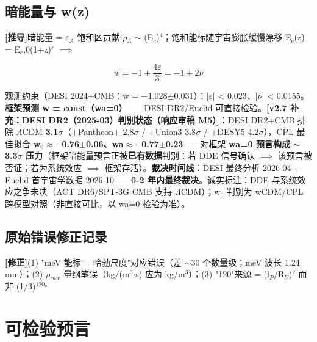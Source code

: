 \documentclass[UTF8,fontset=windows]{csoarticle}
\newcommand{\mtag}[1]{\textbf{[#1]}}
\newcommand{\up}[1]{\ensuremath{^{#1}}}
\newcommand{\down}[1]{\ensuremath{_{#1}}}
\begin{document}
\subsection{暗能量与 w(z)}

\mtag{推导}暗能量 = \ensuremath{\varepsilon}\down{A} 饱和区贡献 \ensuremath{\rho}\down{\Lambda{}} \ensuremath{\sim} (E\down{c})\up{4}；饱和能标随宇宙膨胀缓慢漂移 E\down{c}(z) = E\down{c},0(1+z)\up{\varepsilon{}} \ensuremath{\implies}

\[w = -1 + \frac{4\varepsilon}{3} = -1 + 2\nu\]

观测约束（DESI 2024+CMB：w = \ensuremath{-}1.028\ensuremath{\pm}0.031）：|\ensuremath{\varepsilon}| < 0.023、|\ensuremath{\nu}| < 0.0155。\textbf{框架预测 w = const（wa=0）}------DESI DR2/Euclid 可直接检验。\textbf{\mtag{v2.7 补充：DESI DR2（2025-03）判别状态（响应审稿 M5）}}：DESI DR2+CMB 排除 \ensuremath{\Lambda}CDM \textbf{3.1\ensuremath{\sigma}}（+Pantheon+ 2.8\ensuremath{\sigma} / +Union3 3.8\ensuremath{\sigma} / +DESY5 4.2\ensuremath{\sigma}），CPL 最佳拟合 \textbf{w\down{0}\ensuremath{\approx}\ensuremath{-}0.76\ensuremath{\pm}0.06、wa\ensuremath{\approx}\ensuremath{-}0.77\ensuremath{\pm}0.23}------对框架 \textbf{wa=0 预言构成 \ensuremath{\sim}3.3\ensuremath{\sigma} 压力}（框架暗能量预言正被\textbf{已有数据}判别：若 DDE 信号确认 \ensuremath{\implies} 该预言被否证；若为系统效应 \ensuremath{\implies} 框架存活）。\textbf{裁决时间线}：DESI 最终分析 2026-04 + Euclid 首宇宙学数据 2026-10------\textbf{0-2 年内最终裁决}。诚实标注：DDE 与系统效应之争未决（ACT DR6/SPT-3G CMB 支持 \ensuremath{\Lambda}CDM）；w\down{0} 判别为 wCDM/CPL 跨模型对照（非直接可比，以 wa=0 检验为准）。

\subsection{原始错误修正记录}

\mtag{修正}(1) "meV 能标 = 哈勃尺度"对应错误（差 \ensuremath{\sim}30 个数量级；meV 波长 1.24 mm）；(2) \ensuremath{\rho}\down{raw} 量纲笔误（kg/(m\up{3}\ensuremath{\cdot}s) 应为 kg/m\up{3}）；(3) "120"来源 = (l\down{P}/R\down{U})\up{2} 而非 (1/3)\up{120。}



\section{可检验预言}
\end{document}
